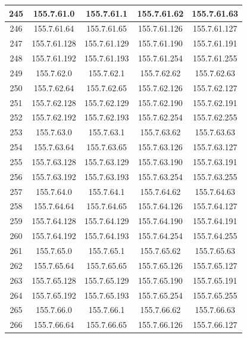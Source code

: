\documentclass[letterpaper,12pt]{article}
\begin{document}
\begin{longtable}{|c|c|c|c|c|}
        245 & 155.7.61.0 & 155.7.61.1 & 155.7.61.62 & 155.7.61.63 \\ \hline
        246 & 155.7.61.64 & 155.7.61.65 & 155.7.61.126 & 155.7.61.127 \\ \hline
        247 & 155.7.61.128 & 155.7.61.129 & 155.7.61.190 & 155.7.61.191 \\ \hline
        248 & 155.7.61.192 & 155.7.61.193 & 155.7.61.254 & 155.7.61.255 \\ \hline
        249 & 155.7.62.0 & 155.7.62.1 & 155.7.62.62 & 155.7.62.63 \\ \hline
        250 & 155.7.62.64 & 155.7.62.65 & 155.7.62.126 & 155.7.62.127 \\ \hline
        251 & 155.7.62.128 & 155.7.62.129 & 155.7.62.190 & 155.7.62.191 \\ \hline
        252 & 155.7.62.192 & 155.7.62.193 & 155.7.62.254 & 155.7.62.255 \\ \hline
        253 & 155.7.63.0 & 155.7.63.1 & 155.7.63.62 & 155.7.63.63 \\ \hline
        254 & 155.7.63.64 & 155.7.63.65 & 155.7.63.126 & 155.7.63.127 \\ \hline
        255 & 155.7.63.128 & 155.7.63.129 & 155.7.63.190 & 155.7.63.191 \\ \hline
        256 & 155.7.63.192 & 155.7.63.193 & 155.7.63.254 & 155.7.63.255 \\ \hline
        257 & 155.7.64.0 & 155.7.64.1 & 155.7.64.62 & 155.7.64.63 \\ \hline
        258 & 155.7.64.64 & 155.7.64.65 & 155.7.64.126 & 155.7.64.127 \\ \hline
        259 & 155.7.64.128 & 155.7.64.129 & 155.7.64.190 & 155.7.64.191 \\ \hline
        260 & 155.7.64.192 & 155.7.64.193 & 155.7.64.254 & 155.7.64.255 \\ \hline
        261 & 155.7.65.0 & 155.7.65.1 & 155.7.65.62 & 155.7.65.63 \\ \hline
        262 & 155.7.65.64 & 155.7.65.65 & 155.7.65.126 & 155.7.65.127 \\ \hline
        263 & 155.7.65.128 & 155.7.65.129 & 155.7.65.190 & 155.7.65.191 \\ \hline
        264 & 155.7.65.192 & 155.7.65.193 & 155.7.65.254 & 155.7.65.255 \\ \hline
        265 & 155.7.66.0 & 155.7.66.1 & 155.7.66.62 & 155.7.66.63 \\ \hline
        266 & 155.7.66.64 & 155.7.66.65 & 155.7.66.126 & 155.7.66.127 \\ \hline

\end{longtable}
\end{document}
